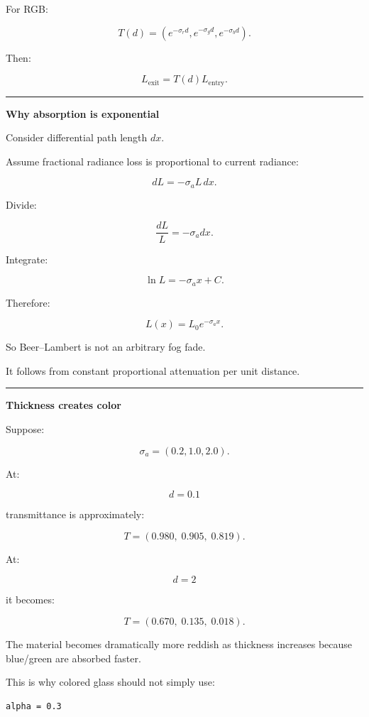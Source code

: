 For RGB:

\[
\boxed{
T(d)
=
\left(
e^{-\sigma_r d},
e^{-\sigma_g d},
e^{-\sigma_b d}
\right).
}
\]

Then:

\[
L_{\text{exit}}
=
T(d)
L_{\text{entry}}.
\]

\begin{center}\rule{0.5\linewidth}{0.5pt}\end{center}

\textbf{Why absorption is exponential}

Consider differential path length \(dx\).

Assume fractional radiance loss is proportional to current radiance:

\[
dL=-\sigma_aL\,dx.
\]

Divide:

\[
\frac{dL}{L}
=
-\sigma_a dx.
\]

Integrate:

\[
\ln L
=
-\sigma_a x+C.
\]

Therefore:

\[
L(x)
=
L_0e^{-\sigma_a x}.
\]

So Beer--Lambert is not an arbitrary fog fade.

It follows from constant proportional attenuation per unit distance.

\begin{center}\rule{0.5\linewidth}{0.5pt}\end{center}

\textbf{Thickness creates color}

Suppose:

\[
\sigma_a=
(0.2,1.0,2.0).
\]

At:

\[
d=0.1
\]

transmittance is approximately:

\[
T=
(0.980,\;0.905,\;0.819).
\]

At:

\[
d=2
\]

it becomes:

\[
T=
(0.670,\;0.135,\;0.018).
\]

The material becomes dramatically more reddish as thickness increases because blue/green are absorbed faster.

This is why colored glass should not simply use:

\begin{verbatim}
alpha = 0.3
\end{verbatim}


